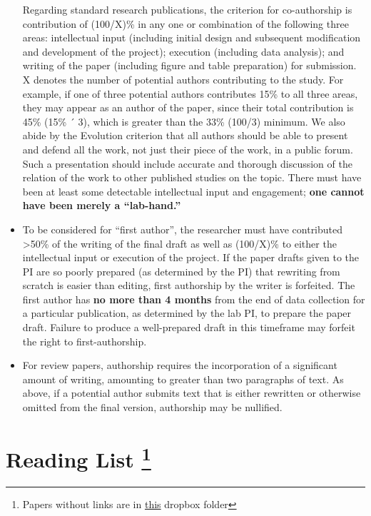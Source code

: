 \documentclass[
]{book}
\begin{document}
\begin{itemize}
  Regarding standard research publications, the criterion for co-authorship is contribution of (100/X)\% in any one or combination of the following three areas: intellectual input (including initial design and subsequent modification and development of the project); execution (including data analysis); and writing of the paper (including figure and table preparation) for submission. X denotes the number of potential authors contributing to the study. For example, if one of three potential authors contributes 15\% to all three areas, they may appear as an author of the paper, since their total contribution is 45\% (15\% ´ 3), which is greater than the 33\% (100/3) minimum. We also abide by the Evolution criterion that all authors should be able to present and defend all the work, not just their piece of the work, in a public forum. Such a presentation should include accurate and thorough discussion of the relation of the work to other published studies on the topic. There must have been at least some detectable intellectual input and engagement; \textbf{one cannot have been merely a ``lab-hand.''}
\item
  To be considered for ``first author'', the researcher must have contributed \textgreater50\% of the writing of the final draft as well as (100/X)\% to either the intellectual input or execution of the project. If the paper drafts given to the PI are so poorly prepared (as determined by the PI) that rewriting from scratch is easier than editing, first authorship by the writer is forfeited. The first author has \textbf{no more than 4 months} from the end of data collection for a particular publication, as determined by the lab PI, to prepare the paper draft. Failure to produce a well-prepared draft in this timeframe may forfeit the right to first-authorship.
\item
  For review papers, authorship requires the incorporation of a significant amount of writing, amounting to greater than two paragraphs of text. As above, if a potential author submits text that is either rewritten or otherwise omitted from the final version, authorship may be nullified.
\end{itemize}

\hypertarget{reading-list}{%
\chapter[Reading List ]{\texorpdfstring{Reading List \footnote{Papers without links are in \href{https://drive.google.com/drive/u/0/folders/1e0APGtvOwW9aTcG3hoEQwf31LJStRsO8}{this} dropbox folder}}{Reading List }}\label{reading-list}}
\end{document}
